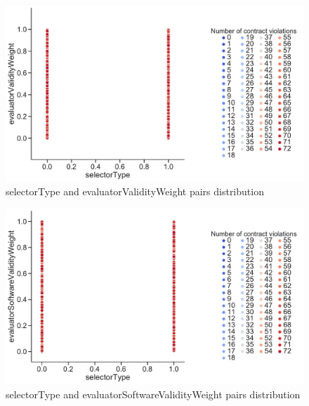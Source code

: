 \begin{figure}
	\centering
	\includegraphics[width=\textwidth]{images/PairsDistr/selectorType_evaluatorValidityWeight.pdf}
	\caption[selectorType and evaluatorValidityWeight pairs distribution]{selectorType and evaluatorValidityWeight pairs distribution}
	\label{fig:selectorType_evaluatorValidityWeight_pair}
\end{figure}
\clearpage
\begin{figure}
	\centering
	\includegraphics[width=\textwidth]{images/PairsDistr/selectorType_evaluatorSoftwareValidityWeight.pdf}
	\caption[selectorType and evaluatorSoftwareValidityWeight pairs distribution]{selectorType and evaluatorSoftwareValidityWeight pairs distribution}
	\label{fig:selectorType_evaluatorSoftwareValidityWeight_pair}
\end{figure}
\clearpage
